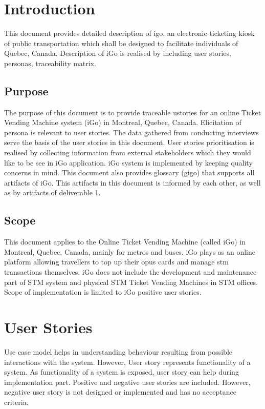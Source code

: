 \documentclass[11pt, english]{report}
\begin{document}
\newcommand{\CC}{C\nolinebreak\hspace{-.05em}\raisebox{.4ex}{\tiny\bf +}\nolinebreak\hspace{-.10em}\raisebox{.4ex}{\tiny\bf +}}
\def\CC{{C\nolinebreak[4]\hspace{-.05em}\raisebox{.4ex}{\tiny\bf ++}}}

\tableofcontents
\newpage

\chapter{Introduction}
This document provides detailed description of \gls{igo}, an electronic ticketing kiosk of public transportation which shall be designed to facilitate individuals of Quebec, Canada. Description of iGo is realised by including user stories, personas, traceability matrix.

\section{Purpose}
The purpose of this document is to provide traceable \gls{ustories} for an online Ticket Vending Machine system (iGo) in Montreal, Quebec, Canada. Elicitation of persona is relevant to user stories. The data gathered from conducting interviews serve the basis of the user stories in this document. User stories prioritisation is realised by collecting information from external stakeholders which they would like to be see in iGo application. iGo system is implemented by keeping quality concerns in mind. This document also provides glossary (\gls{gigo}) that supports all artifacts of iGo. This artifacts in this document is informed by each other, as well as by artifacts of deliverable 1.
\section{Scope}
This document applies to the Online Ticket Vending Machine (called iGo)  in Montreal, Quebec, Canada, mainly for metros and buses. iGo plays as an online platform  allowing  \gls{travellers}  to top up their \gls{opus} cards and manage \gls{stm} transactions themselves. iGo does not include the development and maintenance part of STM system and physical STM Ticket Vending Machines in STM offices. Scope of implementation is limited to iGo positive user stories.



\chapter{User Stories}
Use case model helps in understanding behaviour resulting from possible interactions with the system. However, User story represents functionality of a system\cite{userstoriesincontext}. As functionality of a system is exposed, user story can help during implementation part. Positive and negative user stories are included. However, negative user story is not designed or implemented and has no acceptance criteria\cite{kamthan2016characterization}.
\end{document}
